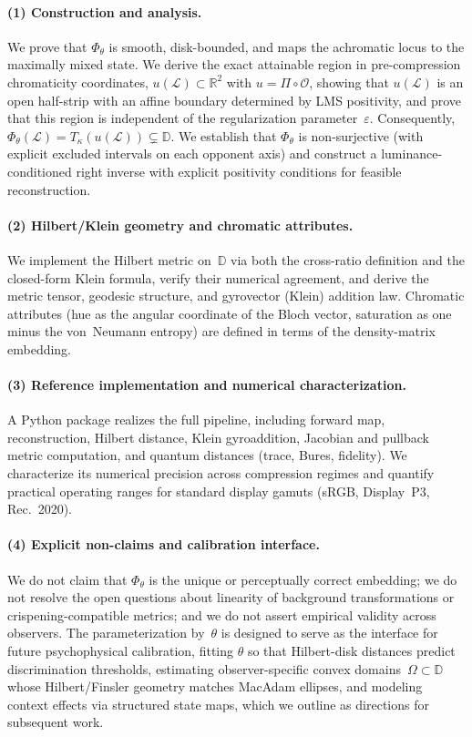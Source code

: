 \documentclass[11pt]{article}
\theoremstyle{plain}
\theoremstyle{definition}
\theoremstyle{remark}
\newcommand{\R}{\mathbb{R}}
\begin{document}
\paragraph{(1) Construction and analysis.}
We prove that $\Phi_\theta$ is smooth, disk-bounded, and maps the achromatic locus to the maximally mixed state.
We derive the exact attainable region in pre-compression chromaticity coordinates, $u(\mathcal{L}) \subset \R^2$ with $u = \Pi \circ \mathcal{O}$, showing that $u(\mathcal{L})$ is an open half-strip with an affine boundary determined by LMS positivity, and prove that this region is independent of the regularization parameter~$\varepsilon$.
Consequently, $\Phi_\theta(\mathcal{L}) = T_\kappa(u(\mathcal{L})) \subsetneq \mathbb{D}$.
We establish that $\Phi_\theta$ is non-surjective (with explicit excluded intervals on each opponent axis) and construct a luminance-conditioned right inverse with explicit positivity conditions for feasible reconstruction.

\paragraph{(2) Hilbert/Klein geometry and chromatic attributes.}
We implement the Hilbert metric on~$\mathbb{D}$ via both the cross-ratio definition and the closed-form Klein formula, verify their numerical agreement, and derive the metric tensor, geodesic structure, and gyrovector (Klein) addition law.
Chromatic attributes (hue as the angular coordinate of the Bloch vector, saturation as one minus the von~Neumann entropy) are defined in terms of the density-matrix embedding.

\paragraph{(3) Reference implementation and numerical characterization.}
A Python package realizes the full pipeline, including forward map, reconstruction, Hilbert distance, Klein gyroaddition, Jacobian and pullback metric computation, and quantum distances (trace, Bures, fidelity).
We characterize its numerical precision across compression regimes and quantify practical operating ranges for standard display gamuts (sRGB, Display~P3, Rec.~2020).

\paragraph{(4) Explicit non-claims and calibration interface.}
We do not claim that $\Phi_\theta$ is the unique or perceptually correct embedding; we do not resolve the open questions about linearity of background transformations or crispening-compatible metrics; and we do not assert empirical validity across observers.
The parameterization by~$\theta$ is designed to serve as the interface for future psychophysical calibration, fitting $\theta$ so that Hilbert-disk distances predict discrimination thresholds, estimating observer-specific convex domains~$\Omega \subset \mathbb{D}$ whose Hilbert/Finsler geometry matches MacAdam ellipses, and modeling context effects via structured state maps, which we outline as directions for subsequent work.
\end{document}
